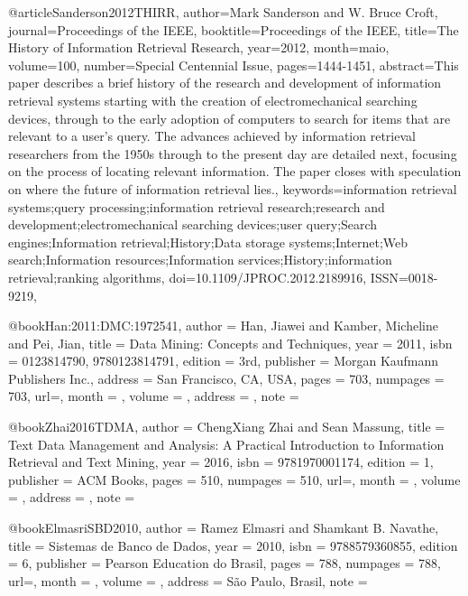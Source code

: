 @article{Sanderson2012THIRR,
    author={Mark Sanderson and W. Bruce Croft},
    journal={Proceedings of the IEEE},
    booktitle={Proceedings of the IEEE},
    title={{T}he {H}istory of {I}nformation {R}etrieval {R}esearch},
    year={2012},
    month={maio},
    volume={100},
    number={Special Centennial Issue},
    pages={1444-1451},
    abstract={This paper describes a brief history of the research and development of information retrieval systems starting with the creation of electromechanical searching devices, through to the early adoption of computers to search for items that are relevant to a user's query. The advances achieved by information retrieval researchers from the 1950s through to the present day are detailed next, focusing on the process of locating relevant information. The paper closes with speculation on where the future of information retrieval lies.},
    keywords={information retrieval systems;query processing;information retrieval research;research and development;electromechanical searching devices;user query;Search engines;Information retrieval;History;Data storage systems;Internet;Web search;Information resources;Information services;History;information retrieval;ranking algorithms},
    doi={10.1109/JPROC.2012.2189916},
    ISSN={0018-9219},
}

@book{Han:2011:DMC:1972541,
    author = {Han, Jiawei and Kamber, Micheline and Pei, Jian},
    title = {Data Mining: Concepts and Techniques},
    year = {2011},
    isbn = {0123814790, 9780123814791},
    edition = {3rd},
    publisher = {Morgan Kaufmann Publishers Inc.},
    address = {San Francisco, CA, USA},
    pages = {703},
    numpages = {703},
    url={},
    month = {},
    volume   = {},
    address  = {},
    note     = {}
} 


@book{Zhai2016TDMA,
    author = {ChengXiang Zhai and Sean Massung},
    title = {Text Data Management and Analysis: A Practical Introduction to Information Retrieval and Text Mining},
    year = {2016},
    isbn = {9781970001174},
    edition = {1},
    publisher = {ACM Books},
    pages = {510},
    numpages = {510},
    url={},
    month = {},
    volume   = {},
    address  = {},
    note     = {}
} 

@book{ElmasriSBD2010,
    author = {Ramez Elmasri and Shamkant B. Navathe},
    title = {Sistemas de Banco de Dados},
    year = {2010},
    isbn = {9788579360855},
    edition = {6},
    publisher = {Pearson Education do Brasil},
    pages = {788},
    numpages = {788},
    url={},
    month = {},
    volume   = {},
    address  = {São Paulo, Brasil},
    note     = {}
} 

